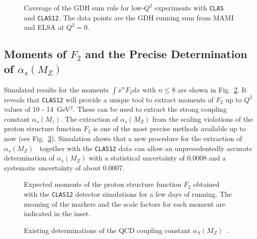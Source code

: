 \begin{figure}
\begin{center}
\begin{minipage}[t]{0.6\linewidth}
\centerline{}
\end{minipage}\hfill
\begin{minipage}[c]{0.35\linewidth}
\vspace*{-7cm}
\caption{\small{Coverage of the GDH sum rule for low-$Q^2$ experiments with 
{\tt CLAS} and {\tt CLAS12}.  The data points are the GDH running sum from 
MAMI and ELSA at $Q^2=0$.}}
\label{gdhf}
\end{minipage}
\end{center}
\end{figure}

\subsection{Moments of $F_2$ and the Precise Determination of $\alpha_s(M_Z)$}

Simulated results for the moments $\int x^n F_2 dx$  with $n \leq 8$ are 
shown in Fig.~\ref{fig:moments}.  It reveals that {\tt CLAS12} will provide 
a unique tool to extract moments of $F_2$ up to $Q^2$ values of 
10 - 14~GeV$^2$.  These can be used to extract the strong coupling constant 
$\alpha_{s}(M_{z})$.  The extraction of $\alpha_s(M_Z)$ from the scaling 
violations of the proton structure function $F_2$ is one of the most precise 
methods available up to now (see Fig.~\ref{fig:alpha}).  Simulation shows that 
a new procedure for the extraction of $\alpha_s(M_Z)$~\cite{Simula:2003vf} 
together with the {\tt CLAS12} data can allow an unprecedentedly accurate 
determination of $\alpha_s(M_Z)$ with a statistical uncertainty of 0.0008 and 
a systematic uncertainty of about 0.0007.

\begin{figure}[htbp]
\vspace{8.0cm}
\caption{\small{Expected moments of the proton structure function $F_2$ 
obtained with the {\tt CLAS12} detector simulations for a few days of 
running.  The meaning of the markers and the scale factors for each moment 
are indicated in the inset.}}
\label{fig:moments} 
\end{figure}

\begin{figure}[htbp]
\vspace{10.5cm}
\caption{\small{Existing determinations of the QCD coupling constant 
$\alpha_S(M_Z)$~\cite{alpha}.}}
\label{fig:alpha} 
\end{figure}

